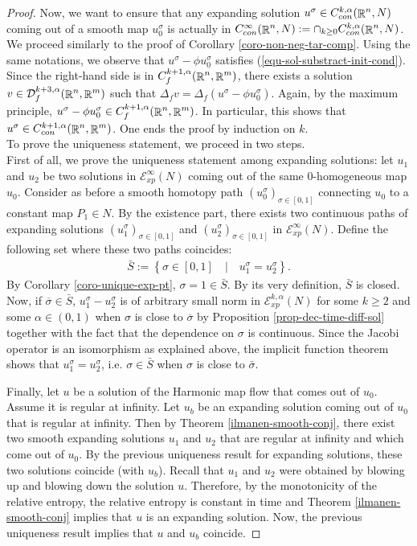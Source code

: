 \documentclass[a4paper,11pt,reqno]{amsart}
\def\R{\mathop{\rm \mathbb{R}}\nolimits}
\begin{document}
\begin{proof}
Now, we want to ensure that any expanding solution $u^{\sigma}\in C_{con}^{k,\alpha}(\R^n,N)$ coming out of a smooth map $u_0^{\sigma}$ is actually in $C^{\infty}_{con}(\R^n,N):=\cap_{k\geq 0}C_{con}^{k,\alpha}(\R^n,N)$. We proceed similarly to the proof of Corollary \ref{coro-non-neg-tar-comp}. Using the same notations, we observe that $u^{\sigma}-\phi u^{\sigma}_0$ satisfies (\ref{equ-sol-substract-init-cond}). Since the right-hand side is in $C^{k+1,\alpha}_f(\R^n,\R^m)$, there exists a solution $v\in \mathcal{D}_f^{k+3,\alpha}(\R^n,\R^m)$ such that $\Delta_fv=\Delta_f(u^{\sigma}-\phi u^{\sigma}_0)$. Again, by the maximum principle, $u^{\sigma}-\phi u_0^{\sigma}\in C^{k+1,\alpha}_f(\R^n,\R^m)$. In particular, this shows that $u^{\sigma} \in C^{k+1,\alpha}_{con}(\R^n,\R^m)$. One ends the proof by induction on $k$.\\


To prove the uniqueness statement, we proceed in two steps.\\

First of all, we prove the uniqueness statement among expanding solutions: let $u_1$ and $u_2$ be two solutions in $\mathcal{E}_{xp}^{\infty}(N)$ coming out of the same $0$-homogeneous map $u_0$. Consider as before a smooth homotopy path $(u_0^{\sigma})_{\sigma\in[0,1]}$ connecting $u_0$ to a constant map $P_1\in N$. By the existence part, there exists two continuous paths of expanding solutions $(u_1^{\sigma})_{\sigma\in[0,1]}$ and $(u_2^{\sigma})_{\sigma\in[0,1]}$ in $\mathcal{E}_{xp}^{\infty}(N)$. Define the following set where these two paths coincides: 
\begin{eqnarray*}
\bar{S}:=\left\{\sigma\in[0,1]\quad|\quad u_1^{\sigma}=u_2^{\sigma}\right\}.
\end{eqnarray*}
By Corollary \ref{coro-unique-exp-pt}, $\sigma=1\in \bar{S}$. By its very definition, $\bar{S}$ is closed. Now, if $\overline{\sigma}\in\bar{S}$, $u_1^{\sigma}-u_2^{\sigma}$ is of arbitrary small norm in $\mathcal{E}_{xp}^{k,\alpha}(N)$ for some $k\geq 2$ and some $\alpha\in(0,1)$ when $\sigma$ is close to $\overline{\sigma}$ by Proposition \ref{prop-dec-time-diff-sol} together with the fact that the dependence on $\sigma $ is continuous. Since the Jacobi operator is an isomorphism as explained above, the implicit function theorem shows that $u_1^{\sigma}=u_2^{\sigma}$, i.e. $\sigma\in \bar{S}$ when $\sigma$ is close to $\bar{\sigma}$.

Finally, let $u$ be a solution of the Harmonic map flow that comes out of $u_0$. Assume it is regular at infinity. Let $u_b$ be an expanding solution coming out of $u_0$ that is regular at infinity. Then by Theorem \ref{ilmanen-smooth-conj}, there exist two smooth expanding solutions $u_1$ and $u_2$ that are regular at infinity and which come out of $u_0$. By the previous uniqueness result for expanding solutions, these two solutions coincide (with $u_b$). Recall that $u_1$ and $u_2$ were obtained by blowing up and blowing down the solution $u$. Therefore, by the monotonicity of the relative entropy, the relative entropy is constant in time and Theorem \ref{ilmanen-smooth-conj} implies that $u$ is an expanding solution. Now, the previous uniqueness result implies that $u$ and $u_b$ coincide. 

\end{proof}




\end{document}
